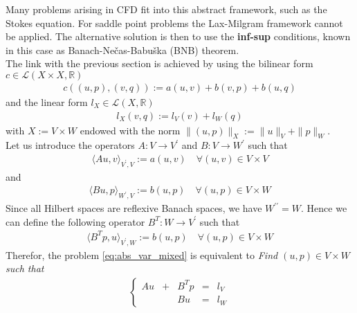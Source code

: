 Many problems arising in CFD fit into this abstract framework, such as the Stokes equation. For saddle point problems the Lax-Milgram framework cannot be applied. The alternative solution is then to use the \textbf{inf-sup} conditions, known in this case as  Banach-Ne\v{c}as-Babu\v{s}ka (BNB) theorem. 
\\
\noindent
The link with the previous section is achieved by using the bilinear form
$c \in \mathcal{L}(X\times X, \mathbb{R})$
\begin{align}
  c((u, p), (v, q)) := a(u,v) + b(v,p) + b(u,q) 
  \label{eq:abs_var_mixed_c}
\end{align}
and the linear form
$l_X \in \mathcal{L}(X, \mathbb{R})$
\begin{align}
  l_X(v, q) := l_V(v) + l_W(q)
  \label{eq:abs_var_mixed_l}
\end{align}
with $X := V \times W$ endowed with the norm $\| (u,p) \|_X := \| u \|_V + \| p \|_W$.
\\
\noindent
Let us introduce the operators $A: V \rightarrow V^\prime$ and $B: V \rightarrow W^\prime$ such that
\begin{align}
  \langle Au, v \rangle_{V^\prime, V} := a(u,v) \quad \forall (u,v) \in V \times V
\end{align}
and
\begin{align}
  \langle Bu, p \rangle_{W^\prime, V} := b(u,p) \quad \forall (u,p) \in V \times W
\end{align}
Since all Hilbert spaces are reflexive Banach spaces, we have $W^{\prime\prime} = W$. Hence we can define the following operator $B^T: W \rightarrow V^\prime$ such that 
\begin{align}
  \langle B^T p, u \rangle_{V^\prime, W} := b(u,p) \quad \forall (u,p) \in V \times W
\end{align}
Therefor, the problem \eqref{eq:abs_var_mixed} is equivalent to 
{\em Find $(u,p)\in V\times W$ such that}
\begin{align}
  \left\{ 
  \begin{array}{cccccc}
    A u & + & B^T p &=& l_V \\
        &   & B u   &=& l_W
  \end{array} \right.
  \label{eq:abs_var_mixed_op}
\end{align}
